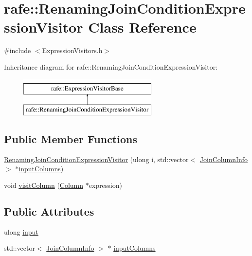\hypertarget{classrafe_1_1_renaming_join_condition_expression_visitor}{\section{rafe\+:\+:Renaming\+Join\+Condition\+Expression\+Visitor Class Reference}
\label{classrafe_1_1_renaming_join_condition_expression_visitor}
}


{\ttfamily \#include $<$Expression\+Visitors.\+h$>$}

Inheritance diagram for rafe\+:\+:Renaming\+Join\+Condition\+Expression\+Visitor\+:\begin{figure}[H]
\begin{center}
\leavevmode
\includegraphics[height=2.000000cm]{classrafe_1_1_renaming_join_condition_expression_visitor}
\end{center}
\end{figure}
\subsection*{Public Member Functions}
\begin{DoxyCompactItemize}
\item 
\hyperlink{classrafe_1_1_renaming_join_condition_expression_visitor_a8ece3014ff37b853468ce79d9ec30b5c}{Renaming\+Join\+Condition\+Expression\+Visitor} (ulong i, std\+::vector$<$ \hyperlink{classrafe_1_1_join_column_info}{Join\+Column\+Info} $>$ $\ast$\hyperlink{classrafe_1_1_renaming_join_condition_expression_visitor_a5bda93a30172d4f098a6d4063175d730}{input\+Columns})
\item 
void \hyperlink{classrafe_1_1_renaming_join_condition_expression_visitor_a5e8310c5df8f8f36c96958fbcee0edd3}{visit\+Column} (\hyperlink{classrafe_1_1_column}{Column} $\ast$expression)
\end{DoxyCompactItemize}
\subsection*{Public Attributes}
\begin{DoxyCompactItemize}
\item 
ulong \hyperlink{classrafe_1_1_renaming_join_condition_expression_visitor_a1802743c1bde8346e752011ccd1810d2}{input}
\item 
std\+::vector$<$ \hyperlink{classrafe_1_1_join_column_info}{Join\+Column\+Info} $>$ $\ast$ \hyperlink{classrafe_1_1_renaming_join_condition_expression_visitor_a5bda93a30172d4f098a6d4063175d730}{input\+Columns}
\end{DoxyCompactItemize}


